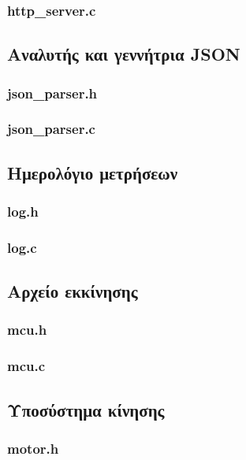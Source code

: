 \subsubsection*{http\_server.c}



\subsection*{Αναλυτής και γεννήτρια JSON}
\subsubsection*{json\_parser.h}

\subsubsection*{json\_parser.c}



\subsection*{Ημερολόγιο μετρήσεων}
\subsubsection*{log.h}

\subsubsection*{log.c}



\subsection*{Αρχείο εκκίνησης}
\subsubsection*{mcu.h}

\subsubsection*{mcu.c}



\subsection*{Υποσύστημα κίνησης}
\subsubsection*{motor.h}

